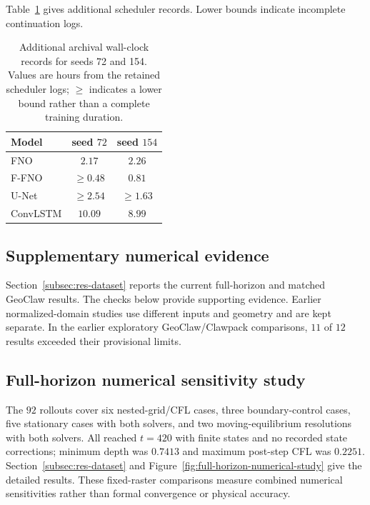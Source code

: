 Table~\ref{tab:app-training-time-additional} gives additional scheduler records. Lower bounds indicate incomplete continuation logs.

\begin{table}[pos=!htbp]
\centering
\caption{Additional archival wall-clock records for seeds 72 and 154. Values are hours from the retained scheduler logs; $\geq$ indicates a lower bound rather than a complete training duration.}
\label{tab:app-training-time-additional}
\begin{tabular}{lcc}
    \toprule
    Model & seed $72$ & seed $154$ \\
    \midrule
    FNO & $2.17$ & $2.26$ \\
    F-FNO & $\geq 0.48$ & $0.81$ \\
    U-Net & $\geq 2.54$ & $\geq 1.63$ \\
    ConvLSTM & $10.09$ & $8.99$ \\
    \bottomrule
\end{tabular}
\end{table}

\FloatBarrier
\subsection{Supplementary numerical evidence}
\label{app:validation-details}

Section~\ref{subsec:res-dataset} reports the current full-horizon and matched GeoClaw results. The checks below provide supporting evidence. Earlier normalized-domain studies use different inputs and geometry and are kept separate. In the earlier exploratory GeoClaw/Clawpack comparisons, $11$ of $12$ results exceeded their provisional limits.

\subsection{Full-horizon numerical sensitivity study}
\label{app:full-horizon-sensitivity}

The $92$ rollouts cover six nested-grid/CFL cases, three boundary-control cases, five stationary cases with both solvers, and two moving-equilibrium resolutions with both solvers. All reached $t=420$ with finite states and no recorded state corrections; minimum depth was $0.7413$ and maximum post-step CFL was $0.2251$. Section~\ref{subsec:res-dataset} and Figure~\ref{fig:full-horizon-numerical-study} give the detailed results. These fixed-raster comparisons measure combined numerical sensitivities rather than formal convergence or physical accuracy.

